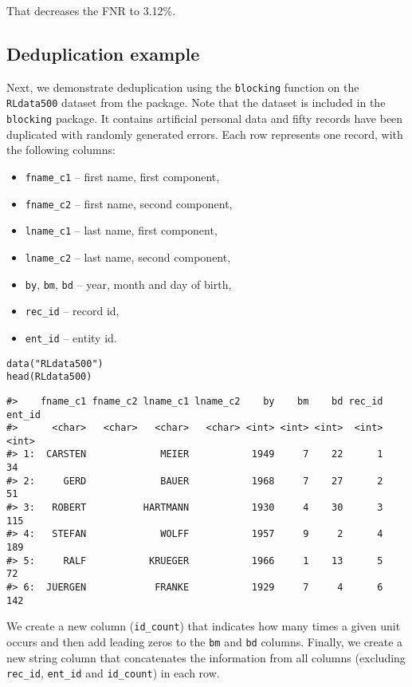 That decreases the FNR to
3.12\%.

\subsection{Deduplication example}\label{deduplication-example}

Next, we demonstrate deduplication using the \texttt{blocking} function on the
\texttt{RLdata500} dataset from the  package. Note that
the dataset is included in the \texttt{blocking} package. It contains
artificial personal data and fifty records have been duplicated with
randomly generated errors. Each row represents one record, with the
following columns:

\begin{itemize}
\tightlist
\item
  \texttt{fname\_c1} -- first name, first component,
\item
  \texttt{fname\_c2} -- first name, second component,
\item
  \texttt{lname\_c1} -- last name, first component,
\item
  \texttt{lname\_c2} -- last name, second component,
\item
  \texttt{by}, \texttt{bm}, \texttt{bd} -- year, month and day of birth,
\item
  \texttt{rec\_id} -- record id,
\item
  \texttt{ent\_id} -- entity id.
\end{itemize}

\begin{verbatim}
data("RLdata500")
head(RLdata500)
\end{verbatim}

\begin{verbatim}
#>    fname_c1 fname_c2 lname_c1 lname_c2    by    bm    bd rec_id ent_id
#>      <char>   <char>   <char>   <char> <int> <int> <int>  <int>  <int>
#> 1:  CARSTEN             MEIER           1949     7    22      1     34
#> 2:     GERD             BAUER           1968     7    27      2     51
#> 3:   ROBERT          HARTMANN           1930     4    30      3    115
#> 4:   STEFAN             WOLFF           1957     9     2      4    189
#> 5:     RALF           KRUEGER           1966     1    13      5     72
#> 6:  JUERGEN            FRANKE           1929     7     4      6    142
\end{verbatim}

We create a new column (\texttt{id\_count}) that indicates how many times a
given unit occurs and then add leading zeros to the \texttt{bm} and \texttt{bd}
columns. Finally, we create a new string column that concatenates the
information from all columns (excluding \texttt{rec\_id}, \texttt{ent\_id} and
\texttt{id\_count}) in each row.

